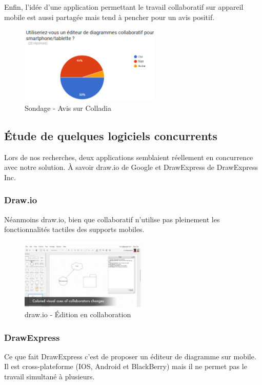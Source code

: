 \vspace{200pt}

Enfin, l'idée d'une application permettant le travail collaboratif sur appareil mobile est aussi partagée mais tend à pencher pour un avis positif.

\begin{figure}[h]
	\centering
	\includegraphics[width=0.6\textwidth]{img/sondage_colladia}
	\caption{Sondage - Avis sur Colladia}
\end{figure}


\newpage
\subsection{Étude de quelques logiciels concurrents}
Lors de nos recherches, deux applications semblaient réellement en concurrence avec notre solution. À savoir draw.io de Google et DrawExpress de DrawExpress Inc.



\subsubsection{Draw.io}
Néanmoins draw.io, bien que collaboratif n'utilise pas pleinement les fonctionnalités tactiles des supports mobiles.

\begin{figure}[h]
	\centering
	\includegraphics[width=6cm]{img/drawio}
	\caption{draw.io - Édition en collaboration}
\end{figure}




\subsubsection{DrawExpress}
Ce que fait DrawExpress c'est de proposer un éditeur de diagramme sur mobile. Il est cross-plateforme (IOS, Android et BlackBerry) mais il ne permet pas le travail simultané à plusieurs.

